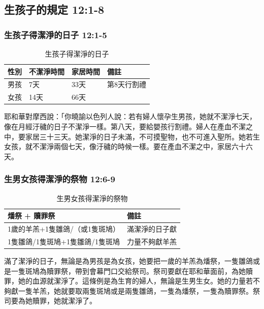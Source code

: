 \subsection{生孩子的規定 12:1-8}
\subsubsection{生孩子得潔淨的日子 12:1-5}
\begin{table}
\vspace*{-6mm}
\centering
\begin{tabular}{|l|l|l|l|}
\hline
\hline
性別 &   不潔淨時間 & 家居時間 & 備註 \\ \hline
男孩 &     7天        & 33天 & 第8天行割禮\\ \hline
女孩&      14天       & 66天   &  \\\hline
\end{tabular}
\caption{生孩子得潔淨的日子}
\end{table}
耶和華對摩西說：「你曉諭以色列人說：若有婦人懷孕生男孩，她就不潔淨七天，像在月經汙穢的日子不潔淨一樣。第八天，要給嬰孩行割禮。婦人在產血不潔之中，要家居三十三天。她潔淨的日子未滿，不可摸聖物，也不可進入聖所。她若生女孩，就不潔淨兩個七天，像汙穢的時候一樣。要在產血不潔之中，家居六十六天。


\subsubsection{生男女孩得潔淨的祭物 12:6-9}
\begin{table}
\vspace*{-6mm}
\centering
\begin{tabular}{|l|l|}
\hline
\hline
    燔祭 + 贖罪祭 & 備註 \\ \hline
1歲的羊羔+1隻雛鴿/（或1隻斑鳩）             &滿潔淨的日子獻\\ 
1隻雛鴿/1隻斑鳩+1隻雛鴿/1隻斑鳩&力量不夠獻羊羔 \\\hline
\end{tabular}
\caption{生男女孩得潔淨的祭物}
\end{table}
滿了潔淨的日子，無論是為男孩是為女孩，她要把一歲的羊羔為燔祭，一隻雛鴿或是一隻斑鳩為贖罪祭，帶到會幕門口交給祭司。祭司要獻在耶和華面前，為她贖罪，她的血源就潔淨了。這條例是為生育的婦人，無論是生男生女。她的力量若不夠獻一隻羊羔，她就要取兩隻斑鳩或是兩隻雛鴿，一隻為燔祭，一隻為贖罪祭。祭司要為她贖罪，她就潔淨了。


